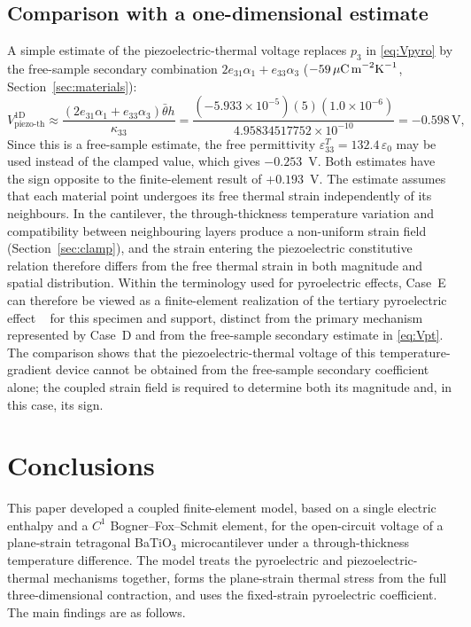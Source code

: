 \documentclass[pdflatex,sn-mathphys-num]{sn-jnl}
\begin{document}
\subsection{Comparison with a one-dimensional estimate}
\label{sec:estimate}

A simple estimate of the piezoelectric-thermal voltage replaces $p_3$ in
\eqref{eq:Vpyro} by the free-sample secondary combination
$2e_{31}\alpha_1+e_{33}\alpha_3$
($-59\,\mu\text{C\,m}^{-2}\text{K}^{-1}$, Section~\ref{sec:materials}):
\begin{equation}
V_{\mathrm{piezo\text{-}th}}^{\mathrm{1D}}
\approx
\frac{(2e_{31}\alpha_1+e_{33}\alpha_3)\bar\theta h}{\kappa_{33}}
=
\frac{(-5.933\times10^{-5})(5)(1.0\times10^{-6})}
{4.95834517752\times10^{-10}}
=-0.598\,\text{V},
\label{eq:Vpt}
\end{equation}
Since this is a free-sample estimate, the free permittivity
$\varepsilon_{33}^T=132.4\,\varepsilon_0$ may be used instead of the clamped value,
which gives $-0.253$~V. Both estimates have the sign opposite to the finite-element
result of $+0.193$~V. The estimate assumes that each material point undergoes its
free thermal strain independently of its neighbours. In the cantilever, the
through-thickness temperature variation and compatibility between neighbouring
layers produce a non-uniform strain field (Section~\ref{sec:clamp}), and the strain
entering the piezoelectric constitutive relation therefore differs from the free
thermal strain in both magnitude and spatial distribution. Within the terminology
used for pyroelectric effects, Case~E can therefore be viewed as a
finite-element realization of the tertiary pyroelectric effect
~\cite{Lang2005Pyro} for this specimen and support, distinct from the primary
mechanism represented by Case~D and from the free-sample secondary estimate in
\eqref{eq:Vpt}. The comparison shows that the piezoelectric-thermal voltage of this
temperature-gradient device cannot be obtained from the free-sample secondary
coefficient alone; the coupled strain field is required to determine both its
magnitude and, in this case, its sign.

\section{Conclusions}
\label{sec:conclusions}

This paper developed a coupled finite-element model, based on a single electric
enthalpy and a $C^1$ Bogner--Fox--Schmit element, for the open-circuit voltage of a
plane-strain tetragonal BaTiO$_3$ microcantilever under a through-thickness temperature
difference. The model treats the pyroelectric and piezoelectric-thermal mechanisms
together, forms the plane-strain thermal stress from the full three-dimensional
contraction, and uses the fixed-strain pyroelectric coefficient. The main findings are
as follows.
\end{document}
